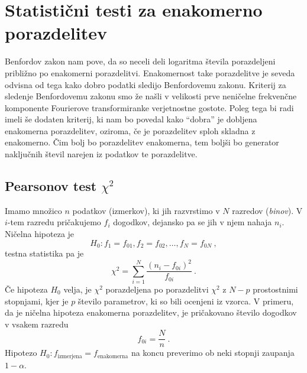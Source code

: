 \documentclass[11pt, oneside]{article}
\theoremstyle{definition}
\begin{document}
\newpage
\section{Statistični testi za enakomerno porazdelitev} %
Benfordov zakon nam pove, da so neceli deli logaritma števila porazdeljeni približno po enakomerni porazdelitvi.
Enakomernost take porazdelitve je seveda odvisna od tega kako dobro podatki sledijo Benfordovemu zakonu.
Kriterij za sledenje Benfordovemu zakonu smo že našli v velikosti prve neničelne frekvenčne komponente
Fourierove transformiranke verjetnostne gostote. Poleg tega bi radi imeli še dodaten kriterij, ki nam bo povedal
kako ``dobra'' je dobljena enakomerna porazdelitev, oziroma, če je porazdelitev sploh skladna z enakomerno. Čim bolj bo porazdelitev enakomerna, tem boljši bo
generator naključnih števil narejen iz podatkov te porazdelitve.

\subsection{Pearsonov test $\chi^2$}
Imamo množico $n$ podatkov (izmerkov), ki jih razvrstimo v $N$ razredov (\emph{binov}).
V $i$-tem razredu pričakujemo $f_i$ dogodkov, dejansko pa se jih v njem nahaja $n_i$.
Ničelna hipoteza je
\begin{equation}
    H_0: f_1=f_{01},f_2=f_{02}, \ldots, f_N=f_{0N} \>,
\end{equation}
testna statistika pa je
\begin{equation}
    \chi^2 = \sum_{i=1}^N \frac{(n_i - f_{0i})^2}{f_{0i}} \>.
\end{equation}
Če hipoteza $H_0$ velja, je $\chi^2$ porazdeljena po porazdelitvi $\chi^2$ z $N-p$ prostostnimi stopnjami, kjer je $p$ število
parametrov, ki so bili ocenjeni iz vzorca. V primeru, da je ničelna hipoteza enakomerna porazdelitev, je pričakovano število
dogodkov v vsakem razredu
\begin{equation}
    f_{0i} = \frac{N}{n} \>.
\end{equation}
Hipotezo $H_0:f_\text{izmerjena}=f_\text{enakomerna}$ na koncu preverimo ob neki stopnji zaupanja $1-\alpha$.
\end{document}
